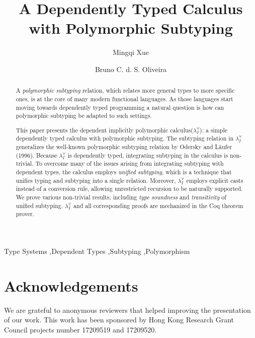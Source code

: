 \documentclass[authoryear]{elsarticle}
\title{A Dependently Typed Calculus with Polymorphic Subtyping}
\author{Mingqi Xue}
\author{Bruno C. d. S. Oliveira}
\newcommand{\system}[0]{the dependent implicitly polymorphic calculus\xspace}
\newcommand{\name}[0]{$\lambda_{I}^{\forall}$\xspace}
\begin{document}
\begin{abstract}
  A \emph{polymorphic subtyping} relation, which relates more general types
  to more specific ones, is at the core of many modern functional languages.
  As those languages start moving towards dependently typed programming a
  natural question is how can polymorphic subtyping be adapted to such settings.

  This paper presents \system (\name): a simple dependently typed calculus
  with polymorphic subtyping. The subtyping relation in \name
  generalizes the well-known polymorphic subtyping relation by
  Odersky and L\"aufer (1996). Because \name is dependently typed,
  integrating subtyping in the calculus is non-trivial. To overcome
  many of the issues arising from integrating subtyping with dependent
  types, the calculus employs \emph{unified subtyping}, which is a technique
  that unifies typing and subtyping into a single relation. Moreover, \name
  employs explicit casts instead of a conversion rule, allowing
  unrestricted recursion to be naturally supported.
  We prove various non-trivial results, including \emph{type soundness} and \emph{transitivity}
  of unified subtyping. \name and all corresponding proofs
  are mechanized in the Coq theorem prover.
\end{abstract}

\begin{keyword}
  Type Systems \sep Dependent Types \sep Subtyping \sep Polymorphism
\end{keyword}

\maketitle









\section*{Acknowledgements}
We are grateful to anonymous reviewers that helped improving the presentation of
our work. This work has been sponsored by Hong Kong Research Grant Council
projects number 17209519 and 17209520.

% 


\end{document}
